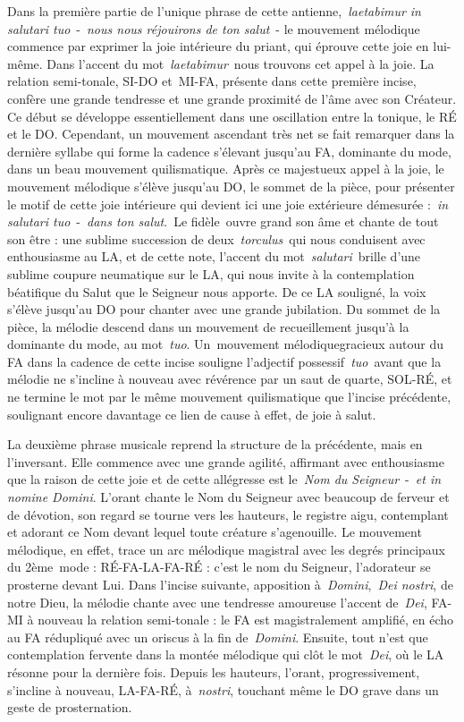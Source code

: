 \documentclass[Session2026.tex]{subfiles}
\begin{document}
Dans la première partie de l'unique phrase de cette
antienne,~\emph{laetabimur in salutari tuo}~-~\emph{nous nous réjouirons
de ton salut}~- le mouvement mélodique commence par exprimer la joie
intérieure du priant, qui éprouve cette joie en lui-même. Dans l'accent
du mot~\emph{laetabimur}~nous trouvons cet appel à la joie. La relation
semi-tonale, SI-DO et~MI-FA, présente dans cette première incise,
confère une grande tendresse et une grande proximité de l'âme avec son
Créateur. Ce début se développe essentiellement dans une oscillation
entre la tonique, le RÉ et le DO. Cependant, un mouvement ascendant très
net se fait remarquer dans la dernière syllabe qui forme la cadence
s'élevant jusqu'au FA, dominante du mode, dans un beau mouvement
quilismatique. Après ce majestueux appel à la joie, le mouvement
mélodique s'élève jusqu'au DO, le sommet de la pièce, pour présenter le
motif de cette joie intérieure qui devient ici une joie extérieure
démesurée :~\emph{in salutari tuo}~-~\emph{dans ton salut}.~Le
fidèle~ouvre grand son âme et chante de tout son être : une sublime
succession de deux~\emph{torculus}~qui nous conduisent avec enthousiasme
au LA, et de cette note, l'accent du mot~\emph{salutari}~brille d'une
sublime coupure neumatique sur le LA, qui nous invite à la contemplation
béatifique du Salut que le Seigneur nous apporte. De ce LA souligné, la
voix s'élève jusqu'au DO pour chanter avec une grande jubilation. Du
sommet de la pièce, la mélodie descend dans un mouvement de
recueillement jusqu'à la dominante du mode, au mot~\emph{tuo}.
Un~mouvement mélodiquegracieux autour du FA dans la cadence de cette
incise souligne l'adjectif possessif~\emph{tuo}~avant que la mélodie ne
s'incline à nouveau avec révérence par un saut de quarte, SOL-RÉ, et ne
termine le mot par le même mouvement quilismatique que l'incise
précédente, soulignant encore davantage ce lien de cause à effet, de
joie à salut.

La deuxième phrase musicale reprend la structure de la précédente, mais
en l'inversant. Elle commence avec une grande agilité, affirmant avec
enthousiasme que la raison de cette joie et de cette allégresse est
le~\emph{Nom du Seigneur}~-~\emph{et in nomine Domini}. L'orant chante
le Nom du Seigneur avec beaucoup de ferveur et de dévotion, son regard
se tourne vers les hauteurs, le registre aigu, contemplant et adorant ce
Nom devant lequel toute créature s'agenouille. Le mouvement mélodique,
en effet, trace un arc mélodique magistral avec les degrés principaux du
2ème~mode : RÉ-FA-LA-FA-RÉ : c'est le nom du Seigneur, l'adorateur se
prosterne devant Lui. Dans l'incise suivante, apposition
à~\emph{Domini},~\emph{Dei nostri}, de notre Dieu, la mélodie chante
avec une tendresse amoureuse l'accent de~\emph{Dei}, FA-MI à nouveau la
relation semi-tonale : le FA est magistralement amplifié, en écho au FA
rédupliqué avec un oriscus à la fin de~\emph{Domini}. Ensuite, tout
n'est que contemplation fervente dans la montée mélodique qui clôt le
mot~\emph{Dei}, où le LA résonne pour la dernière fois. Depuis les
hauteurs, l'orant, progressivement, s'incline à nouveau, LA-FA-RÉ,
à~\emph{nostri}, touchant même le DO grave dans un geste de
prosternation.
\end{document}
